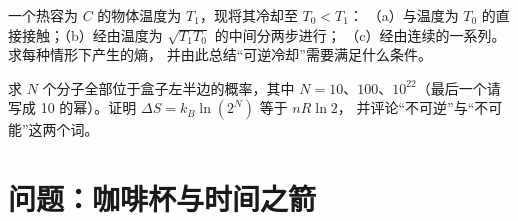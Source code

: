 \begin{exercise}[$\star\star\star$]\label{exo:b1:second-law-entropy:11}
一个热容为 $C$ 的物体温度为 $T_1$，现将其冷却至 $T_0 < T_1$：
（a）与温度为 $T_0$ 的直接接触；（b）经由温度为 $\sqrt{T_1T_0}$ 的中间分两步进行；
（c）经由连续的一系列。
求每种情形下产生的熵，
并由此总结“可逆冷却”需要满足什么条件。
\end{exercise}

\begin{exercise}[$\star\star\star$]\label{exo:b1:second-law-entropy:12}
求 $N$ 个分子全部位于盒子左半边的概率，其中
$N = 10$、$100$、$10^{22}$（最后一个请写成 10 的幂）。证明
$\Delta S = k_B\ln(2^N)$ 等于 $nR\ln2$，
并评论“不可逆”与“不可能”这两个词。
\end{exercise}

\section{问题：咖啡杯与时间之箭}

